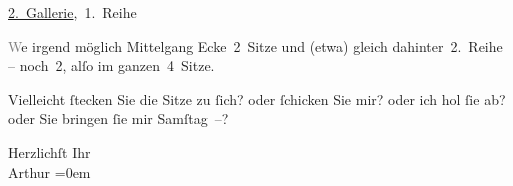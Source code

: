 \pstart
           \uline{2. Gallerie}, 1. Reihe\pend
           
\pstart
           \textcolor{gray}{W}e{\geminationn} irgend möglich Mittelgang
               Ecke 2 Sitze und \introOben{}(etwa)\introOben{} gleich dahinter 2. Reihe – noch 2,
               alſo {\pb}im ganzen 4 Sitze.\pend
           
\pstart
           Vielleicht{ }ſtecken Sie die Sitze zu{ }ſich? oder{ }ſchicken Sie mir? oder ich hol{ }ſie ab?
               oder Sie bringen{ }ſie mir Samſtag –?\pend
           
\pstart
           Herzlichſt Ihr {\\[\baselineskip]}\spacefill\mbox{Arthur}\pend
           \leftskip=0em{}\endnumbering{}  \newcommand{\dateiname}{L03035}\newcommand{\titel}{Arthur Schnitzler an Felix Salten, [14. 5. 1896?]}\newcommand{\editorInnen}{Martin Anton Müller und Laura Untner}
